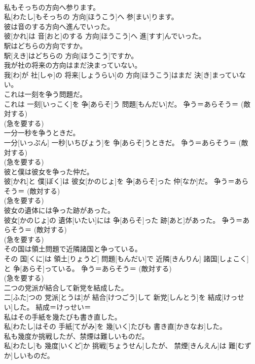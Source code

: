 \documentclass[8pt]{extreport}
\begin{document}
\begin{CJK}{UTF8}{min}
{\\	私もそっちの方向へ参ります。	
\\	私[わたし]もそっちの 方向[ほうこう]へ 参[まい]ります。	
\\	彼は音のする方向へ進んでいった。	
\\	彼[かれ]は 音[おと]のする 方向[ほうこう]へ 進[すす]んでいった。	
\\	駅はどちらの方向ですか。	
\\	駅[えき]はどちらの 方向[ほうこう]ですか。	
\\	我が社の将来の方向はまだ決まっていない。	
\\	我[わ]が 社[しゃ]の 将来[しょうらい]の 方向[ほうこう]はまだ 決[き]まっていない。	
\\	これは一刻を争う問題だ。	
\\	これは 一刻[いっこく]を 争[あらそ]う 問題[もんだい]だ。	争う＝あらそう＝ (敵対する) 
\\	(急を要する)
\\	一分一秒を争うときだ。	
\\	一分[いっぷん] 一秒[いちびょう]を 争[あらそ]うときだ。	争う＝あらそう＝ (敵対する) 
\\	(急を要する)
\\	彼と僕は彼女を争った仲だ。	
\\	彼[かれ]と 僕[ぼく]は 彼女[かのじょ]を 争[あらそ]った 仲[なか]だ。	争う＝あらそう＝ (敵対する) 
\\	(急を要する)
\\	彼女の遺体には争った跡があった。	
\\	彼女[かのじょ]の 遺体[いたい]には 争[あらそ]った 跡[あと]があった。	争う＝あらそう＝ (敵対する) 
\\	(急を要する)
\\	その国は領土問題で近隣諸国と争っている。	
\\	その 国[くに]は 領土[りょうど] 問題[もんだい]で 近隣[きんりん] 諸国[しょこく]と 争[あらそ]っている。	争う＝あらそう＝ (敵対する) 
\\	(急を要する)
\\	二つの党派が結合して新党を結成した。	
\\	二[ふた]つの 党派[とうは]が 結合[けつごう]して 新党[しんとう]を 結成[けっせい]した。	結成＝けっせい＝ 
\\	私はその手紙を幾たびも書き直した。	
\\	私[わたし]はその 手紙[てがみ]を 幾[いく]たびも 書き直[かきなお]した。	
\\	私も幾度か挑戦したが、禁煙は難しいものだ。	
\\	私[わたし]も 幾度[いくど]か 挑戦[ちょうせん]したが、 禁煙[きんえん]は 難[むずか]しいものだ。	
}
\end{CJK}
\end{document}
